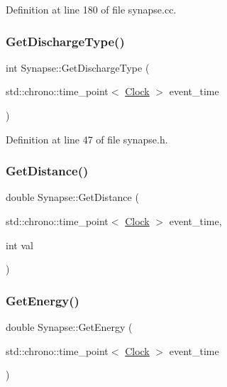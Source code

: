 Definition at line 180 of file synapse.\+cc.

\mbox{\label{class_synapse_a314047a6f724abee8c73a16c68f3a8c2}} 
\subsubsection{\texorpdfstring{Get\+Discharge\+Type()}{GetDischargeType()}}
{\footnotesize\ttfamily int Synapse\+::\+Get\+Discharge\+Type (\begin{DoxyParamCaption}\item[{std\+::chrono\+::time\+\_\+point$<$ \mbox{\hyperlink{universe_8h_a0ef8d951d1ca5ab3cfaf7ab4c7a6fd80}{Clock}} $>$}]{event\+\_\+time }\end{DoxyParamCaption})\hspace{0.3cm}{\ttfamily [inline]}}



Definition at line 47 of file synapse.\+h.

\mbox{\label{class_synapse_a0a0a100802e6662ecf18d39bf2a52d98}} 
\subsubsection{\texorpdfstring{Get\+Distance()}{GetDistance()}}
{\footnotesize\ttfamily double Synapse\+::\+Get\+Distance (\begin{DoxyParamCaption}\item[{std\+::chrono\+::time\+\_\+point$<$ \mbox{\hyperlink{universe_8h_a0ef8d951d1ca5ab3cfaf7ab4c7a6fd80}{Clock}} $>$}]{event\+\_\+time,  }\item[{int}]{val }\end{DoxyParamCaption})}

\mbox{\label{class_synapse_a58659a5134815f7a6e06eb5c60e9033f}} 
\subsubsection{\texorpdfstring{Get\+Energy()}{GetEnergy()}}
{\footnotesize\ttfamily double Synapse\+::\+Get\+Energy (\begin{DoxyParamCaption}\item[{std\+::chrono\+::time\+\_\+point$<$ \mbox{\hyperlink{universe_8h_a0ef8d951d1ca5ab3cfaf7ab4c7a6fd80}{Clock}} $>$}]{event\+\_\+time }\end{DoxyParamCaption})\hspace{0.3cm}{\ttfamily [inline]}}




